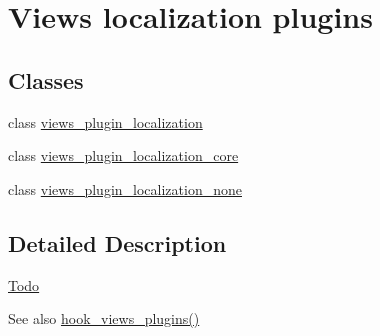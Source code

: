 \hypertarget{group__views__localization__plugins}{
\section{Views localization plugins}
\label{group__views__localization__plugins}
}
\subsection*{Classes}
\begin{DoxyCompactItemize}
\item 
class \hyperlink{classviews__plugin__localization}{views\_\-plugin\_\-localization}
\item 
class \hyperlink{classviews__plugin__localization__core}{views\_\-plugin\_\-localization\_\-core}
\item 
class \hyperlink{classviews__plugin__localization__none}{views\_\-plugin\_\-localization\_\-none}
\end{DoxyCompactItemize}


\subsection{Detailed Description}
\begin{Desc}
\item[\hyperlink{todo__todo000057}{Todo}]\end{Desc}
\begin{DoxySeeAlso}{See also}
\hyperlink{group__views__hooks_ga23f6e9972b2ed84fc54b7ff63f44477d}{hook\_\-views\_\-plugins()} 
\end{DoxySeeAlso}
